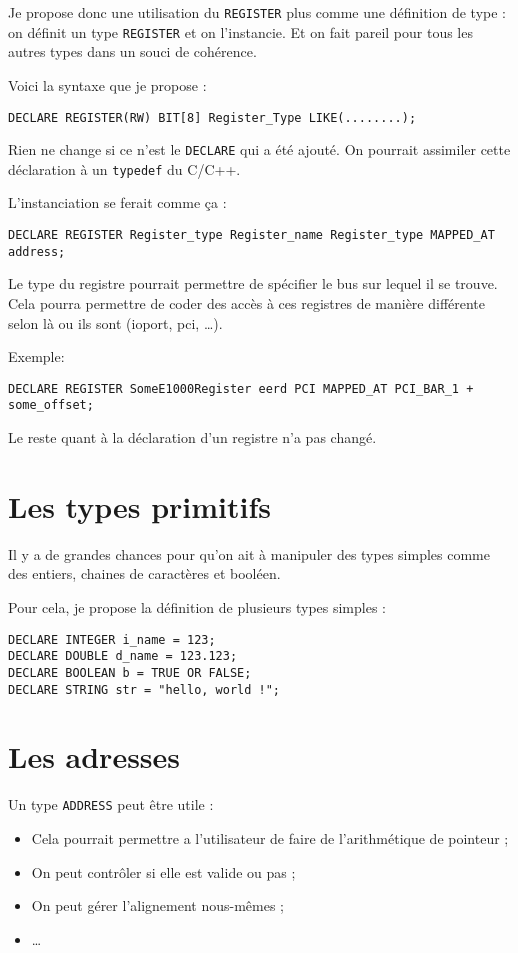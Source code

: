 \documentclass[french]{rtxreport}
\begin{document}
Je propose donc une utilisation du \texttt{REGISTER} plus comme une définition de type : on définit un type \texttt{REGISTER} et on l’instancie. Et on fait pareil pour tous les autres types dans un souci de cohérence.

Voici la syntaxe que je propose :
\begin{lstlisting}
DECLARE REGISTER(RW) BIT[8] Register_Type LIKE(........);
\end{lstlisting}
Rien ne change si ce n’est le \texttt{DECLARE} qui a été ajouté. On pourrait assimiler cette déclaration à un \texttt{typedef} du C/C++.

L’instanciation se ferait comme ça :
\begin{lstlisting}
DECLARE REGISTER Register_type Register_name Register_type MAPPED_AT address;
\end{lstlisting}
Le type du registre pourrait permettre de spécifier le bus sur lequel il se trouve. Cela pourra permettre de coder des accès à ces registres de manière différente selon là ou ils sont (ioport, pci, \ldots).

Exemple:
\begin{lstlisting}
DECLARE REGISTER SomeE1000Register eerd PCI MAPPED_AT PCI_BAR_1 + some_offset;
\end{lstlisting}

Le reste quant à la déclaration d'un registre n'a pas changé.

\section{Les types primitifs}
Il y a de grandes chances pour qu’on ait à manipuler des types simples comme des entiers, chaines de caractères et booléen.

Pour cela, je propose la définition de plusieurs types simples :
\begin{lstlisting}
DECLARE INTEGER i_name = 123;
DECLARE DOUBLE d_name = 123.123;
DECLARE BOOLEAN b = TRUE OR FALSE;
DECLARE STRING str = "hello, world !";
\end{lstlisting}

\section{Les adresses}

Un type \texttt{ADDRESS} peut être utile : 
\begin{itemize}
	\item Cela pourrait permettre a l’utilisateur de faire de l’arithmétique de pointeur ; 
	\item On peut contrôler si elle est valide ou pas ;
	\item On peut gérer l’alignement nous-mêmes ; 
	\item \ldots
\end{itemize}
\end{document}
